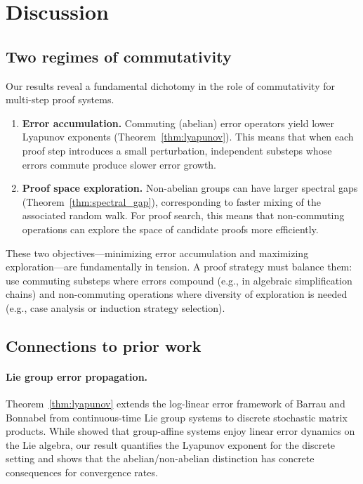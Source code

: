 \section{Discussion}\label{sec:discussion}

\subsection{Two regimes of commutativity}

Our results reveal a fundamental dichotomy in the role of commutativity
for multi-step proof systems.

\begin{enumerate}[leftmargin=*,itemsep=2pt]
\item \textbf{Error accumulation.}
  Commuting (abelian) error operators yield lower Lyapunov exponents
  (Theorem~\ref{thm:lyapunov}).  This means that when each proof step
  introduces a small perturbation, independent substeps whose errors
  commute produce slower error growth.

\item \textbf{Proof space exploration.}
  Non-abelian groups can have larger spectral gaps
  (Theorem~\ref{thm:spectral_gap}), corresponding to faster mixing of
  the associated random walk.  For proof search, this means that
  non-commuting operations can explore the space of candidate proofs
  more efficiently.
\end{enumerate}

These two objectives---minimizing error accumulation and maximizing
exploration---are fundamentally in tension.  A proof strategy must
balance them: use commuting substeps where errors compound (e.g., in
algebraic simplification chains) and non-commuting operations where
diversity of exploration is needed (e.g., case analysis or induction
strategy selection).

\subsection{Connections to prior work}

\paragraph{Lie group error propagation.}
Theorem~\ref{thm:lyapunov} extends the log-linear error framework
of Barrau and Bonnabel \cite{barrau2014} from continuous-time Lie
group systems to discrete stochastic matrix products.  While
\cite{barrau2014} showed that group-affine systems enjoy linear error
dynamics on the Lie algebra, our result quantifies the Lyapunov
exponent for the discrete setting and shows that the abelian/non-abelian
distinction has concrete consequences for convergence rates.

